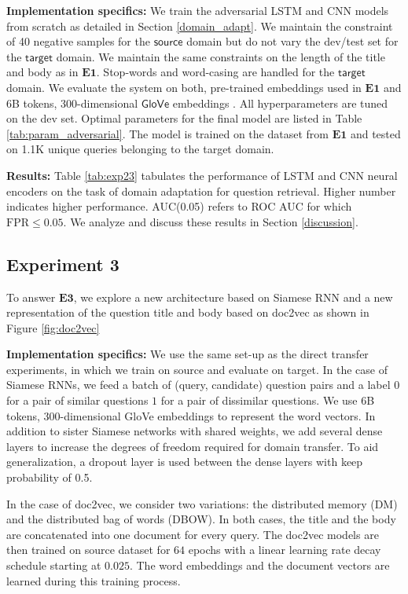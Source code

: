 \documentclass{sigkddExp}
\begin{document}
\textbf{Implementation specifics:} We train the adversarial LSTM and CNN models from scratch as detailed in Section \ref{domain_adapt}. We maintain the constraint of 40 negative samples for the $\mathsf{source}$ domain but do not vary the dev/test set for the $\mathsf{target}$ domain. We maintain the same constraints on the length of the title and body as in $\mathbf{E1}$. Stop-words and word-casing are handled for the $\mathsf{target}$ domain. We evaluate the system on both, pre-trained embeddings used in $\mathbf{E1}$ and 6B tokens, 300-dimensional $\mathsf{GloVe}$ embeddings \cite{pennington2014glove}. All hyperparameters are tuned on the dev set. Optimal parameters for the final model are listed in Table \ref{tab:param_adversarial}. The model is trained on the dataset from $\mathbf{E1}$ and tested on 1.1K unique queries belonging to the \textsf{target} domain.

\textbf{Results:} Table \ref{tab:exp23} tabulates the performance of LSTM and CNN neural encoders on the task of domain adaptation for question retrieval. Higher number indicates higher performance. AUC(0.05) refers to ROC AUC for which $\mathrm{FPR} \leq 0.05$. We analyze and discuss these results in Section \ref{discussion}.

\subsection{Experiment 3}
To answer $\mathbf{E3}$, we explore a new architecture based on Siamese RNN and a new representation of the question title and body based on \textsf{doc2vec} as shown in Figure \ref{fig:doc2vec}

\textbf{Implementation specifics:} We use the same set-up as the direct transfer experiments, in which we train on \textsf{source} and evaluate on \textsf{target}. In the case of Siamese RNNs, we feed a batch of (query, candidate) question pairs and a label $0$ for a pair of similar questions $1$ for a pair of dissimilar questions. We use 6B tokens, 300-dimensional \textsf{GloVe} embeddings to represent the word vectors. In addition to sister Siamese networks with shared weights, we add several dense layers to increase the degrees of freedom required for domain transfer. To aid generalization, a dropout layer is used between the dense layers with keep probability of 0.5.

In the case of \textsf{doc2vec}, we consider two variations: the distributed memory (DM) and the distributed bag of words (DBOW). In both cases, the title and the body are concatenated into one document for every query. The doc2vec models are then trained on \textsf{source} dataset for $64$ epochs with a linear learning rate decay schedule starting at $0.025$. The word embeddings and the document vectors are learned during this training process.
\end{document}
